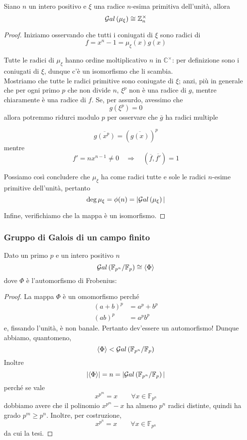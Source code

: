 \begin{multicols}{2}
	\begin{theorem}
		Siano $ n $ un intero positivo e $ \xi $ una radice $ n $-esima primitiva dell'unità, allora
		\[ \mathcal{G}al\left( \mu_{\xi} \right) \cong \mathbb{Z}_n^\times \]
	\end{theorem}
	
	\begin{proof}
		Iniziamo osservando che tutti i coniugati di $ \xi $ sono radici di
		\[ f = x^n -1 = \mu_\xi (x)  g(x)\]
		
		
		Tutte le radici di $ \mu_\xi $ hanno ordine moltiplicativo $ n $ in $ \mathbb{C}^\times $: per definizione sono i coniugati di $ \xi $, dunque c'è un isomorfismo che li scambia.\\
		
		Mostriamo che tutte le radici primitive sono coniugate di $ \xi $; anzi, più in generale che per ogni primo $ p $ che non divide $ n $, $ \xi^p $ non è una radice di $ g $, mentre chiaramente è una radice di $ f $. Se, per assurdo, avessimo che
		\[ g(\xi^p) = 0 \]
		allora potremmo ridurci modulo $ p $ per osservare che $ \bar{g} $ ha radici multiple
		
		\[ \overline{g(x^p)} = \left(\overline{g(x)}\right)^p \]
		mentre
		\[ f' =  nx^{n-1} \neq 0 \quad\Rightarrow\quad (\overline{f}, \overline{f'}) = 1   \]
		
		Possiamo così concludere che $ \mu_\xi $ ha come radici tutte e sole le radici $ n $-esime primitive dell'unità, pertanto
		\[ \deg\mu_\xi = \phi(n) = |\mathcal{G}al\left( \mu_\xi \right)| \]
		
		
		Infine, verifichiamo che la mappa
		è un isomorfismo.
	\end{proof}
	
	
	
	\subsubsection{Gruppo di Galois di un campo finito}
	\begin{theorem}
	Dato un primo $ p $ e un intero positivo $ n $
	\[ \mathcal{G}al\left( \mathbb{F}_{p^n} /\mathbb{F}_p \right) \cong \langle \Phi \rangle \]
	dove $ \Phi $ è l'automorfismo di Frobenius: 
	\end{theorem}
	
	\begin{proof}
		La mappa $ \Phi $ è un omomorfismo perché
		\begin{align*}
		(a + b)^ p &= a^p + b^p \\
		(ab)^p &= a^p b^p
		\end{align*}
		e, fissando l'unità, è non banale. Pertanto dev'essere un automorfismo! Dunque abbiamo, quantomeno,
		\[ \langle \Phi \rangle < \mathcal{G}al\left( \mathbb{F}_{p^n} /\mathbb{F}_p \right) \]
		Inoltre
		\[ |\langle \Phi \rangle| = n = |\mathcal{G}al\left( \mathbb{F}_{p^n} /\mathbb{F}_p \right)| \]
		perché se vale
		\[ x^{p^m} = x \qquad\forall x \in \mathbb{F}_{p^n} \]
		dobbiamo avere che il polinomio $ x^{p^m} - x $ ha almeno $ p^n $ radici distinte, quindi ha grado $ p^m \geq p^n $. Inoltre, per costruzione,
		\[ x^{p^n} = x \qquad\forall x \in \mathbb{F}_{p^n} \]
		da cui la tesi.
	\end{proof}
	

\end{multicols}
